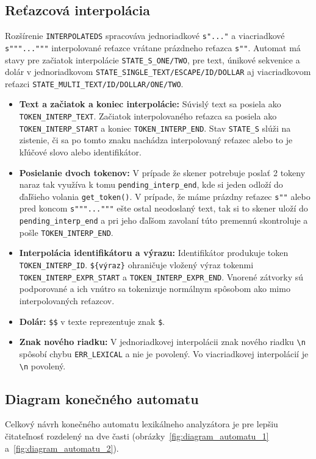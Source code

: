 \subsection{Reťazcová interpolácia}
Rozšírenie \texttt{INTERPOLATEDS} spracováva jednoriadkové \texttt{s"..."} a viacriadkové \verb|s"""..."""| interpolované reťazce vrátane prázdneho reťazca \verb|s""|.
Automat má stavy pre začiatok interpolácie \texttt{STATE\_S\_ONE/TWO}, pre text, únikové sekvenice a dolár v jednoriadkovom \texttt{STATE\_SINGLE\_TEXT/ESCAPE/ID/DOLLAR} aj viacriadkovom reťazci \texttt{STATE\_MULTI\_TEXT/ID/DOLLAR/ONE/TWO}.
\begin{itemize}
    \item \textbf{Text a začiatok a koniec interpolácie:} Súvislý text sa posiela ako \texttt{TOKEN\_INTERP\_TEXT}.
    Začiatok interpolovaného reťazca sa posiela ako \texttt{TOKEN\_INTERP\_START} a koniec  \texttt{TOKEN\_INTERP\_END}.
    Stav \texttt{STATE\_S} slúži na zistenie, či sa po tomto znaku nachádza interpolovaný reťazec alebo to je kľúčové slovo alebo identifikátor.
    \item \textbf{Posielanie dvoch tokenov:} V prípade že skener potrebuje poslať 2 tokeny naraz tak využíva k tomu \texttt{pending\_interp\_end}, kde si jeden odloží do ďaľšieho volania \texttt{get\_token()}.
    V prípade, že máme prázdny reťazec \verb|s""| alebo pred koncom \verb|s"""..."""| ešte ostal neodoslaný text, tak si to skener uloží do \texttt{pending\_interp\_end} a pri jeho ďaľšom zavolaní túto premennú skontroluje a pošle \texttt{TOKEN\_INTERP\_END}.
    \item \textbf{Interpolácia identifikátoru a výrazu:} Identifikátor produkuje token \texttt{TOKEN\_INTERP\_ID}. \texttt{\$\{výraz\}} ohraničuje vložený výraz tokenmi \texttt{TOKEN\_INTERP\_EXPR\_START} a \texttt{TOKEN\_INTERP\_EXPR\_END}.
    Vnorené zátvorky sú podporované a ich vnútro sa tokenizuje normálnym spôsobom ako mimo interpolovaných reťazcov.
    \item \textbf{Dolár:} \texttt{\$\$} v texte reprezentuje znak \texttt{\$}.
    \item \textbf{Znak nového riadku:} V jednoriadkovej interpolácii znak nového riadku \texttt{\textbackslash{}n} spôsobí chybu \texttt{ERR\_LEXICAL} a nie je povolený.
    Vo viacriadkovej interpolácií je \texttt{\textbackslash{}n} povolený.
\end{itemize}

\subsection{Diagram konečného automatu}
Celkový návrh konečného automatu lexikálneho analyzátora je pre lepšiu čitateľnosť rozdelený na dve časti (obrázky~\ref{fig:diagram_automatu_1} a~\ref{fig:diagram_automatu_2}).

